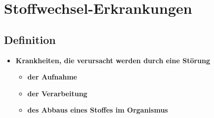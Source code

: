 \section{Stoffwechsel-Erkrankungen}
\subsection{Definition}
	\begin{itemize}
		\item \textbf{Krankheiten, die verursacht werden durch eine Störung}
			\begin{itemize}
				\item \textbf{der Aufnahme}
				\item \textbf{der Verarbeitung}
				\item \textbf{des Abbaus eines Stoffes im Organismus}
			\end{itemize}
	\end{itemize}
	
